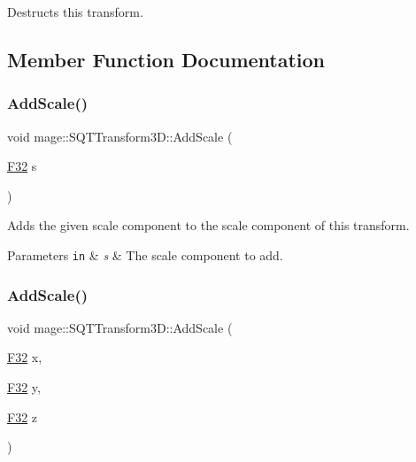 Destructs this transform. 

\subsection{Member Function Documentation}
\mbox{\label{classmage_1_1_s_q_t_transform3_d_a15234f33c977b95ace087c5c31ebcd56}} 
\subsubsection{\texorpdfstring{Add\+Scale()}{AddScale()}\hspace{0.1cm}{\footnotesize\ttfamily [1/4]}}
{\footnotesize\ttfamily void mage\+::\+S\+Q\+T\+Transform3\+D\+::\+Add\+Scale (\begin{DoxyParamCaption}\item[{\mbox{\hyperlink{namespacemage_aa97e833b45f06d60a0a9c4fc22ae02c0}{F32}}}]{s }\end{DoxyParamCaption})\hspace{0.3cm}{\ttfamily [noexcept]}}

Adds the given scale component to the scale component of this transform.


\begin{DoxyParams}[1]{Parameters}
\mbox{\tt in}  & {\em s} & The scale component to add. \\
\hline
\end{DoxyParams}
\mbox{\label{classmage_1_1_s_q_t_transform3_d_abe17a512e63eb5382dd6ed7c9cf6a7ff}} 
\subsubsection{\texorpdfstring{Add\+Scale()}{AddScale()}\hspace{0.1cm}{\footnotesize\ttfamily [2/4]}}
{\footnotesize\ttfamily void mage\+::\+S\+Q\+T\+Transform3\+D\+::\+Add\+Scale (\begin{DoxyParamCaption}\item[{\mbox{\hyperlink{namespacemage_aa97e833b45f06d60a0a9c4fc22ae02c0}{F32}}}]{x,  }\item[{\mbox{\hyperlink{namespacemage_aa97e833b45f06d60a0a9c4fc22ae02c0}{F32}}}]{y,  }\item[{\mbox{\hyperlink{namespacemage_aa97e833b45f06d60a0a9c4fc22ae02c0}{F32}}}]{z }\end{DoxyParamCaption})\hspace{0.3cm}{\ttfamily [noexcept]}}

